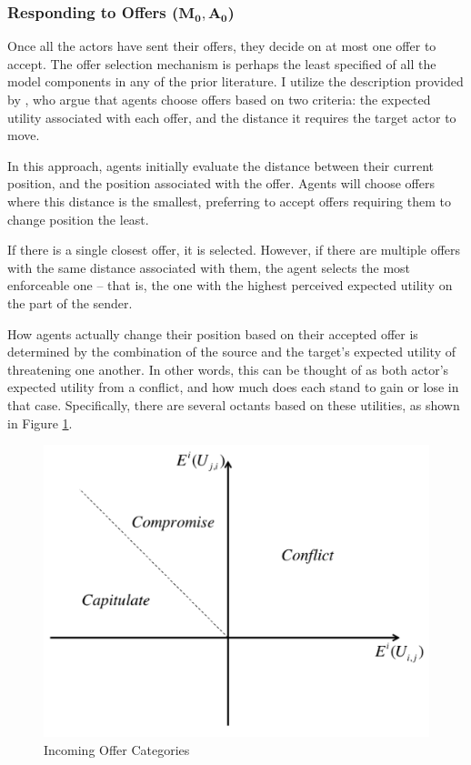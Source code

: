 \subsubsection{Responding to Offers ($\mathbf{M_0, A_0}$)} \label{challenges}

Once all the actors have sent their offers, they decide on at most one offer to accept. The offer selection mechanism is perhaps the least specified of all the model components in any of the prior literature. I utilize the description provided by \citet{scholz_2011}, who argue that agents choose offers based on two criteria: the expected utility associated with each offer, and the distance it requires the target actor to move.

In this approach, agents initially evaluate the distance between their current position, and the position associated with the offer. Agents will choose offers where this distance is the smallest, preferring to accept offers requiring them to change position the least.

If there is a single closest offer, it is selected. However, if there are multiple offers with the same distance associated with them, the agent selects the most enforceable one -- that is, the one with the highest perceived expected utility on the part of the sender.

How agents actually change their position based on their accepted offer is determined by the combination of the source and the target's expected utility of threatening one another. In other words, this can be thought of as both actor's expected utility from a conflict, and how much does each stand to gain or lose in that case. Specifically, there are several octants based on these utilities, as shown in Figure \ref{fig:octants}.

\begin{figure}
  \centering
  \includegraphics[scale=0.5]{BDM_Reproduction/Figures/Octants}
  \caption{Incoming Offer Categories}
  \label{fig:octants}
  \figSpace
\end{figure}

